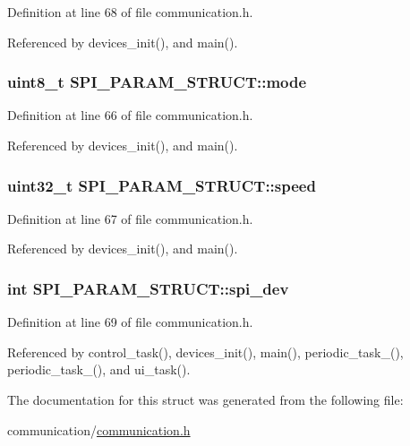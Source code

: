 Definition at line 68 of file communication.h.



Referenced by devices\_\-init(), and main().

\hypertarget{structSPI__PARAM__STRUCT_a82c546c99f6c3daed73c1e23426be847}{
\subsubsection[{mode}]{\setlength{\rightskip}{0pt plus 5cm}uint8\_\-t {\bf SPI\_\-PARAM\_\-STRUCT::mode}}}
\label{structSPI__PARAM__STRUCT_a82c546c99f6c3daed73c1e23426be847}


Definition at line 66 of file communication.h.



Referenced by devices\_\-init(), and main().

\hypertarget{structSPI__PARAM__STRUCT_a53a8d386594a81eb9bc6f971bfe36c54}{
\subsubsection[{speed}]{\setlength{\rightskip}{0pt plus 5cm}uint32\_\-t {\bf SPI\_\-PARAM\_\-STRUCT::speed}}}
\label{structSPI__PARAM__STRUCT_a53a8d386594a81eb9bc6f971bfe36c54}


Definition at line 67 of file communication.h.



Referenced by devices\_\-init(), and main().

\hypertarget{structSPI__PARAM__STRUCT_abe385c44333d268d17cf648c8e371cad}{
\subsubsection[{spi\_\-dev}]{\setlength{\rightskip}{0pt plus 5cm}int {\bf SPI\_\-PARAM\_\-STRUCT::spi\_\-dev}}}
\label{structSPI__PARAM__STRUCT_abe385c44333d268d17cf648c8e371cad}


Definition at line 69 of file communication.h.



Referenced by control\_\-task(), devices\_\-init(), main(), periodic\_\-task\_(), periodic\_\-task\_(), and ui\_\-task().



The documentation for this struct was generated from the following file:\begin{DoxyCompactItemize}
\item 
communication/\hyperlink{communication_8h}{communication.h}\end{DoxyCompactItemize}
